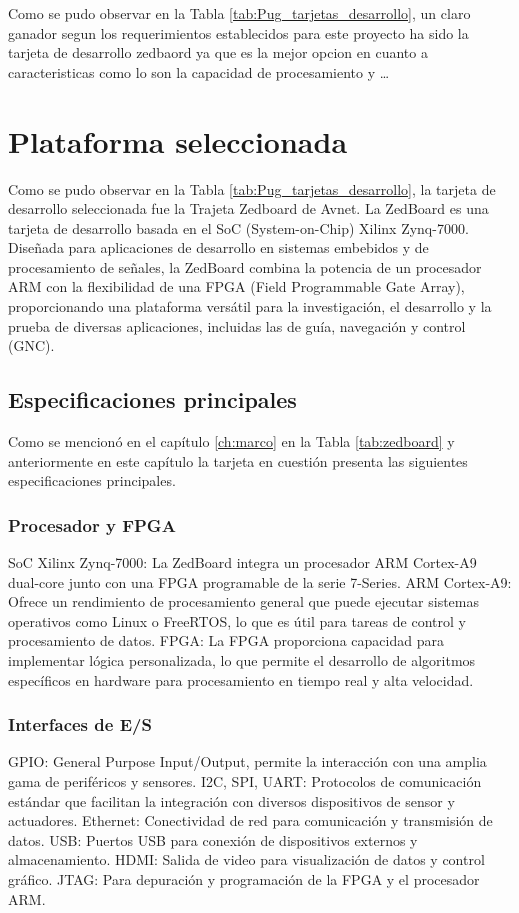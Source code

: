     Como se pudo observar en la Tabla \ref{tab:Pug_tarjetas_desarrollo}, un claro ganador segun los requerimientos establecidos para este proyecto ha sido la tarjeta de desarrollo zedbaord ya que es la mejor opcion en cuanto a caracteristicas como lo son la capacidad de procesamiento y \dots

\section{Plataforma seleccionada}

Como se pudo observar en la Tabla \ref{tab:Pug_tarjetas_desarrollo}, la tarjeta de desarrollo seleccionada fue la Trajeta Zedboard de Avnet. La ZedBoard es una tarjeta de desarrollo basada en el SoC (System-on-Chip) Xilinx Zynq-7000. Diseñada para aplicaciones de desarrollo en sistemas embebidos y de procesamiento de señales, la ZedBoard combina la potencia de un procesador ARM con la flexibilidad de una FPGA (Field Programmable Gate Array), proporcionando una plataforma versátil para la investigación, el desarrollo y la prueba de diversas aplicaciones, incluidas las de guía, navegación y control (GNC).

\subsection{Especificaciones principales}

Como se mencionó en el capítulo \ref{ch:marco} en la Tabla \ref{tab:zedboard} y anteriormente en este capítulo la tarjeta en cuestión presenta las siguientes especificaciones principales.

\subsubsection{Procesador y FPGA}
SoC Xilinx Zynq-7000: La ZedBoard integra un procesador ARM Cortex-A9 dual-core junto con una FPGA programable de la serie 7-Series.
ARM Cortex-A9: Ofrece un rendimiento de procesamiento general que puede ejecutar sistemas operativos como Linux o FreeRTOS, lo que es útil para tareas de control y procesamiento de datos.
FPGA: La FPGA proporciona capacidad para implementar lógica personalizada, lo que permite el desarrollo de algoritmos específicos en hardware para procesamiento en tiempo real y alta velocidad.
\subsubsection{Interfaces de E/S}
GPIO: General Purpose Input/Output, permite la interacción con una amplia gama de periféricos y sensores.
I2C, SPI, UART: Protocolos de comunicación estándar que facilitan la integración con diversos dispositivos de sensor y actuadores.
Ethernet: Conectividad de red para comunicación y transmisión de datos.
USB: Puertos USB para conexión de dispositivos externos y almacenamiento.
HDMI: Salida de video para visualización de datos y control gráfico.
JTAG: Para depuración y programación de la FPGA y el procesador ARM.

